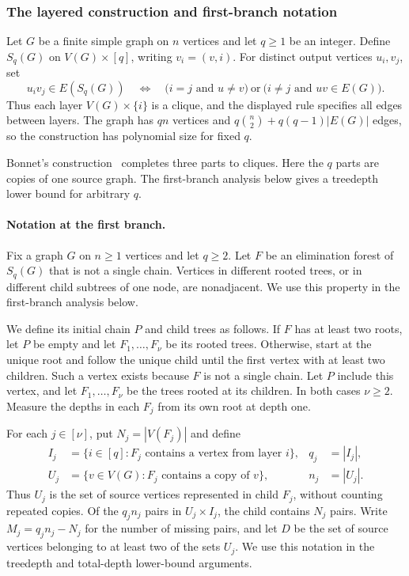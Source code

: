 \subsubsection{The layered construction and first-branch notation}

Let $G$ be a finite simple graph on $n$ vertices and let $q\geq1$
be an integer. Define $S_q(G)$ on $V(G)\times[q]$, writing
$v_i=(v,i)$. For distinct output vertices $u_i,v_j$, set
\[
 u_iv_j\in E(S_q(G))
 \quad\Longleftrightarrow\quad
 \bigl(i=j\text{ and }u\ne v\bigr)
 \ \text{or}\ \bigl(i\ne j\text{ and }uv\in E(G)\bigr).
\]
Thus each layer $V(G)\times\{i\}$ is a clique, and the displayed rule
specifies all edges between layers. The graph has $qn$ vertices and
$q\binom n2+q(q-1)|E(G)|$ edges, so the construction has polynomial
size for fixed $q$.

Bonnet's construction~\cite[Section~3.1]{BonnetTreewidth} completes
three parts to cliques. Here the $q$ parts are copies of one source
graph. The first-branch analysis below gives a treedepth lower bound
for arbitrary $q$.

\paragraph{Notation at the first branch.}
\label{subsec:ugc-branch-notation}

Fix a graph $G$ on $n\geq1$ vertices and let $q\geq2$. Let $F$
be an elimination forest of $S_q(G)$ that is not a single chain.
Vertices in different rooted trees, or in different child subtrees
of one node, are nonadjacent. We use this property in the first-branch
analysis below.

We define its initial chain $P$ and child trees as follows. If $F$
has at least two roots, let $P$ be empty and let $F_1,\ldots,F_\nu$ be
its rooted trees. Otherwise, start at the unique root and follow the
unique child until the first vertex with at least two children.
Such a vertex exists because $F$ is not a single chain. Let $P$
include this vertex, and let $F_1,\ldots,F_\nu$ be the trees rooted at
its children. In both cases $\nu\geq2$. Measure the
depths in each $F_j$ from its own root at depth one.

For each $j\in[\nu]$, put $N_j=|V(F_j)|$ and define
\[
\begin{aligned}
 I_j&=\{i\in[q]:F_j\text{ contains a vertex from layer }i\},
 &q_j&=|I_j|,\\
 U_j&=\{v\in V(G):F_j\text{ contains a copy of }v\},
 &n_j&=|U_j|.
\end{aligned}
\]
Thus $U_j$ is the set of source vertices represented in child
$F_j$, without counting repeated copies. Of the $q_jn_j$ pairs in
$U_j\times I_j$, the child contains $N_j$ pairs. Write
$M_j=q_jn_j-N_j$ for the number of missing pairs, and let $D$
be the set of source vertices
belonging to at least two of the sets $U_j$.
We use this notation in the treedepth and total-depth lower-bound
arguments.

